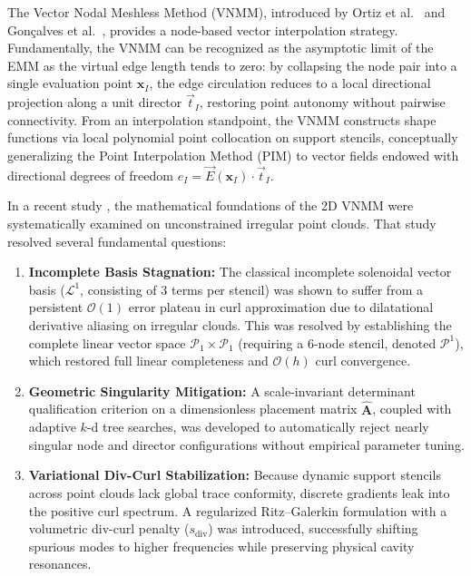 \documentclass[VANCOUVER,Times1COL]{WileyNJD-v5}
\begin{document}
The Vector Nodal Meshless Method (VNMM), introduced by Ortiz et al.~\cite{ortiz2021nodal, ortiz2023tese} and Gonçalves et al.~\cite{goncalves2023vector, goncalves2025tese}, provides a node-based vector interpolation strategy. Fundamentally, the VNMM can be recognized as the asymptotic limit of the EMM as the virtual edge length tends to zero: by collapsing the node pair into a single evaluation point $\mathbf{x}_I$, the edge circulation reduces to a local directional projection along a unit director $\vec{t}_I$, restoring point autonomy without pairwise connectivity. From an interpolation standpoint, the VNMM constructs shape functions via local polynomial point collocation on support stencils, conceptually generalizing the Point Interpolation Method (PIM) \cite{liu2001point, liu2005introduction} to vector fields endowed with directional degrees of freedom $e_I = \vec{E}(\mathbf{x}_I) \cdot \vec{t}_I$.

In a recent study \cite{stable_vnmm2d_2026}, the mathematical foundations of the 2D VNMM were systematically examined on unconstrained irregular point clouds. That study resolved several fundamental questions:
\begin{enumerate}
    \item \textbf{Incomplete Basis Stagnation:} The classical incomplete solenoidal vector basis ($\mathcal{L}^1$, consisting of 3 terms per stencil) was shown to suffer from a persistent $\mathcal{O}(1)$ error plateau in curl approximation due to dilatational derivative aliasing on irregular clouds. This was resolved by establishing the complete linear vector space $\mathcal{P}_1 \times \mathcal{P}_1$ (requiring a 6-node stencil, denoted $\mathcal{P}^1$), which restored full linear completeness and $\mathcal{O}(h)$ curl convergence.
    \item \textbf{Geometric Singularity Mitigation:} A scale-invariant determinant qualification criterion on a dimensionless placement matrix $\widehat{\mathbf{A}}$, coupled with adaptive $k$-d tree searches, was developed to automatically reject nearly singular node and director configurations without empirical parameter tuning.
    \item \textbf{Variational Div-Curl Stabilization:} Because dynamic support stencils across point clouds lack global trace conformity, discrete gradients leak into the positive curl spectrum. A regularized Ritz--Galerkin formulation with a volumetric div-curl penalty ($s_{\mathrm{div}}$) was introduced, successfully shifting spurious modes to higher frequencies while preserving physical cavity resonances.
\end{enumerate}
\end{document}
